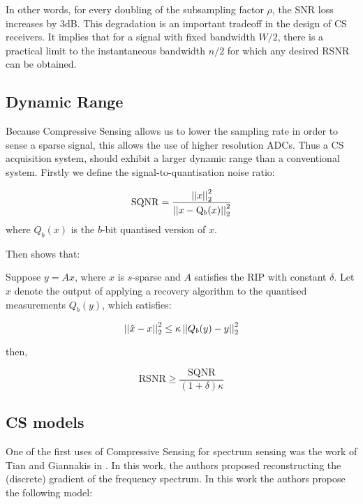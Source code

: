 In other words, for every doubling of the subsampling factor \(\rho\), the SNR loss increases by 3dB. This degradation is an important tradeoff in the design of CS receivers. It implies that for a signal with fixed bandwidth \(W/2\), there is a practical limit to the instantaneous bandwidth \(n/2\) for which any desired RSNR can be obtained. 

\subsection{Dynamic Range}
Because Compressive Sensing allows us to lower the sampling rate in order to sense a sparse signal, this allows the use of higher resolution ADCs. Thus a CS acquisition system, should exhibit a larger dynamic range than a conventional system. Firstly we define the signal-to-quantisation noise ratio:

\begin{definition}
\begin{equation}
\mathrm{SQNR} = \frac{\left|\left|x\right|\right|_2^2}{\left|\left|x-\mathrm{Q}_b(x)\right|\right|_2^2}
\end{equation}
where \(Q_b(x)\) is the \(b\)-bit quantised version of \(x\).
\end{definition}

Then \cite{davenport2012pros} shows that:

\begin{theorem}
Suppose \(y=Ax\), where \(x\) is \(s\)-sparse and \(A\) satisfies the RIP with constant \(\delta\). Let \(\hat{x}\) denote the output of applying a recovery algorithm to the quantised measurements \(Q_b(y)\), which satisfies:

\begin{equation}
\left|\left|\hat{x}-x\right|\right|_2^2 \leq \kappa \left|\left|Q_b(y) - y\right|\right|_2^2
\end{equation}

then,

\begin{equation}
\mathrm{RSNR} \geq \frac{\mathrm{SQNR}}{(1+\delta)\kappa}
\end{equation}
\end{theorem}



\subsection{CS models}
One of the first uses of Compressive Sensing for spectrum sensing was the work of Tian and Giannakis in \cite{Tian2007}. In this work, the authors proposed reconstructing the (discrete) gradient of the frequency spectrum. In this work the authors propose the following model:

